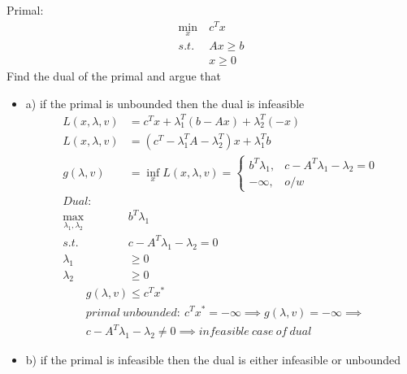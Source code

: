 \documentclass[12pt,letter]{article}
\begin{document}
\begin{enumerate}
  Primal:
  \begin{align*}
    \min_x\ & c^Tx\\
    s.t.\ & Ax \geq b\\
           & x \geq 0
  \end{align*}
  Find the dual of the primal and argue that
  \begin{itemize}
  \item a) if the primal is unbounded then the dual is infeasible
    \begin{align*}
      L(x,\lambda,v) &= c^Tx + \lambda_1^T(b-Ax) + \lambda_2^T(-x)\\
      L(x,\lambda,v) &= (c^T-\lambda_1^TA -\lambda_2^T)x + \lambda_1^Tb\\
      g(\lambda,v) &= \inf_x L(x,\lambda,v) =
      \begin{cases}
        b^T\lambda_1, & c -A^T\lambda_1-\lambda_2 = 0\\
        -\infty, & o/w
      \end{cases}\\
      Dual:\\
      \max_{\lambda_1,\lambda_2}\ & b^T\lambda_1\\
      s.t.\ & c - A^T\lambda_1 - \lambda_2 = 0\\
      \lambda_1 & \geq 0\\
      \lambda_2 & \geq 0
    \end{align*}
  \begin{align*}
    &g(\lambda,v) \leq c^Tx^*\\
    &primal\ unbounded:\ c^Tx^*= -\infty \implies g(\lambda,v) = -\infty \implies\\
    &c -A^T\lambda_1-\lambda_2 \neq 0 \implies infeasible\ case\ of\ dual
  \end{align*}
  \pagebreak
\item b) if the primal is infeasible then the dual is either infeasible or unbounded\\
  

\end{itemize}
\end{enumerate}
\end{document}
